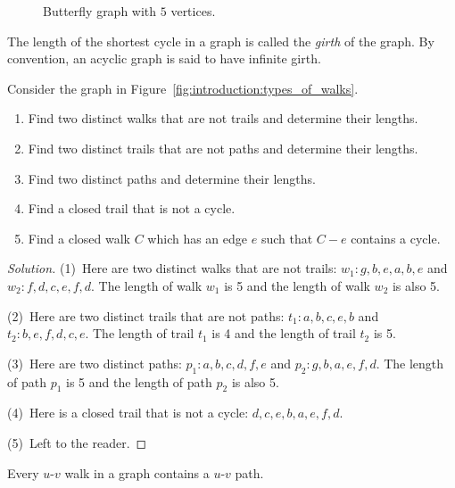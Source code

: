 \begin{figure}[!htbp]
\centering
{}

\caption{Butterfly graph with $5$ vertices.}
\label{fig:introduction:butterfly_graph}
\end{figure}

The length of the shortest cycle in a graph is called the
\emph{girth} of the graph. By convention, an acyclic
graph is said to have infinite girth.

\begin{example}
\label{eg:introduction:walks_paths_trails}
Consider the graph in Figure~\ref{fig:introduction:types_of_walks}.
\begin{enumerate}
\item Find two distinct walks that are not trails and determine their
  lengths.

\item Find two distinct trails that are not paths and determine their
  lengths.

\item Find two distinct paths and determine their lengths.

\item Find a closed trail that is not a cycle.

\item Find a closed walk $C$ which has an edge $e$ such that $C - e$
  contains a cycle.
\end{enumerate}
\end{example}

\begin{proof}[Solution]
(1)~Here are two distinct walks that are not trails:
$w_1: g, b, e, a, b, e$ and $w_2: f, d, c, e, f, d$. The length of
walk $w_1$ is 5 and the length of walk $w_2$ is also 5.

(2)~Here are two distinct trails that are not paths:
$t_1: a,b,c,e,b$ and $t_2: b,e,f,d,c,e$. The length of trail $t_1$ is
4 and the length of trail $t_2$ is 5.

(3)~Here are two distinct paths: $p_1: a, b, c, d, f, e$ and
$p_2: g, b, a, e, f, d$. The length of path $p_1$ is 5 and the length
of path $p_2$ is also 5.

(4)~Here is a closed trail that is not a cycle: $d, c, e, b, a, e, f, d$.

(5)~Left to the reader.
\end{proof}

\begin{theorem}
\label{thm:introduction:every_walk_has_a_path}
Every $u$-$v$ walk in a graph contains a $u$-$v$ path.
\end{theorem}

